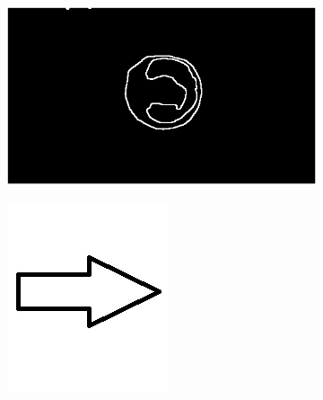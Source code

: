 \documentclass{article}
\begin{document}
\begin{figure}[H]
\centering
\begin{subfigure}{.35\textwidth}
  \centering
  \includegraphics[width=0.97\linewidth]{_Figures/raw_data_1_sobel_algo.png}
  \caption{}
  \label{fig:raw_1}
\end{subfigure}%
\begin{subfigure}{.09\textwidth}
  \centering
  \includegraphics[width=0.97\linewidth]{_Figures/leftrightarrow.jpg}
  \label{fig:arrow}
\end{subfigure}%

\end{figure}
\end{document}
